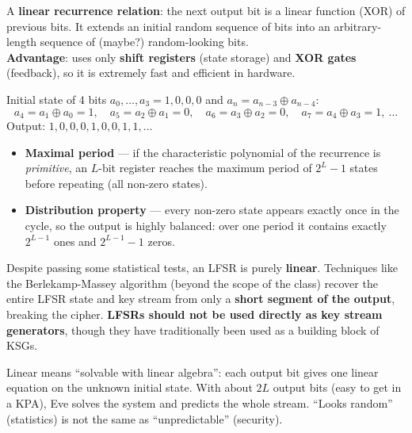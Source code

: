 \begin{defnbox}[title=Linear Feedback Shift Register (LFSR)]
A \textbf{linear recurrence relation}: the next output bit is a linear function (XOR) of
previous bits. It extends an initial random sequence of bits into an arbitrary-length
sequence of (maybe?) random-looking bits. \\
\textbf{Advantage}: uses only \textbf{shift registers} (state storage) and \textbf{XOR
gates} (feedback), so it is extremely fast and efficient in hardware.
\end{defnbox}

\begin{exbox}[title=LFSR example]
Initial state of 4 bits $a_0, \ldots, a_3 = 1, 0, 0, 0$ and $a_n = a_{n-3} \oplus
a_{n-4}$:
\[
  a_4 = a_1 \oplus a_0 = 1,\quad a_5 = a_2 \oplus a_1 = 0,\quad
  a_6 = a_3 \oplus a_2 = 0,\quad a_7 = a_4 \oplus a_3 = 1,\ \ldots
\]
Output: $1, 0, 0, 0, 1, 0, 0, 1, 1, \ldots$
\end{exbox}

\begin{propbox}[title=Randomness of LFSRs]
\begin{itemize}
  \item \textbf{Maximal period} --- if the characteristic polynomial of the recurrence is
        \emph{primitive}, an $L$-bit register reaches the maximum period of
        $2^L - 1$ states before repeating (all non-zero states).
  \item \textbf{Distribution property} --- every non-zero state appears exactly once in
        the cycle, so the output is highly balanced: over one period it contains exactly
        $2^{L-1}$ ones and $2^{L-1} - 1$ zeros.
\end{itemize}
\end{propbox}

\begin{warnbox}[title=LFSR --- math danger]
Despite passing some statistical tests, an LFSR is purely \textbf{linear}. Techniques like
the Berlekamp-Massey algorithm (beyond the scope of the class) recover the entire LFSR
state and key stream from only a \textbf{short segment of the output}, breaking the
cipher. \textbf{LFSRs should not be used directly as key stream generators}, though they
have traditionally been used as a building block of KSGs.
\end{warnbox}

\begin{rembox}[title=Why linearity is fatal]
Linear means ``solvable with linear algebra'': each output bit gives one linear equation
on the unknown initial state. With about $2L$ output bits (easy to get in a KPA), Eve
solves the system and predicts the whole stream. ``Looks random'' (statistics) is not the
same as ``unpredictable'' (security).
\end{rembox}

